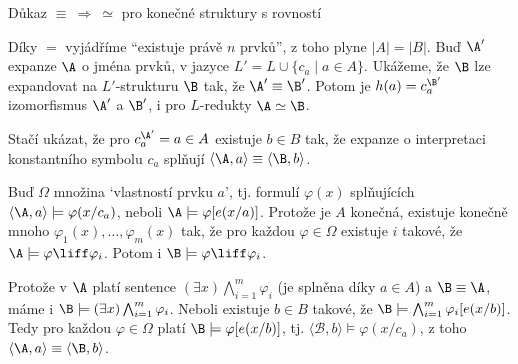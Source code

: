 \documentclass{beamer}
\begin{document}
\begin{frame}{Důkaz $\equiv\ \Rightarrow\ \simeq$ pro konečné struktury s rovností}
    
    \vspace{-6pt}
    Díky $=$ vyjádříme ``existuje právě $n$ prvků'', z toho plyne \alert{$|A|=|B|$}.    
    Buď $\A'$ expanze $\A$ o jména prvků, v jazyce $L'=L\cup\{c_a\mid a\in A\}$. Ukážeme, že $\B$ \alert{lze expandovat} na $L'$-strukturu $\B$ \alert{tak, že $\A'\equiv \B'$}.     
    Potom je \alert{$h(a)= c_a^{\B'}$} izomorfismus $\A'$ a $\B'$, i pro $L$-redukty $\A\simeq\B$.
    
    Stačí ukázat, že \alert{pro $c_a^{\A'}=a\in A$ existuje $b\in B$} tak, že expanze o interpretaci konstantního symbolu $c_a$ splňují \alert{$\langle \A,a\rangle\equiv\langle\B,b\rangle$}. 
    
    Buď $\Omega$ množina `\alert{vlastností prvku $a$}', tj. formulí $\varphi(x)$ splňujících $\langle \A,a\rangle \models \varphi(x/c_a)$, neboli $\A\models \varphi[e(x/a)]$. Protože je $A$ konečná, existuje \alert{konečně mnoho $\varphi_1(x),\dots,\varphi_m(x)$} tak, že pro každou $\varphi \in \Omega$ existuje $i$ takové, že $\A\models \varphi\liff\varphi_i$. Potom i $\B\models\varphi\liff\varphi_i$. %
        
        Protože v $\A$ platí sentence \alert{$(\exists x)\bigwedge_{i=1}^m\varphi_i$} (je splněna díky $a\in A$) a $\B\equiv\A$, máme i $\B\models (\exists x)\bigwedge_{i=1}^m\varphi_i$. Neboli existuje $b\in B$ takové, že $\B\models \bigwedge_{i=1}^m\varphi_i[e(x/b)]$. Tedy pro každou $\varphi\in \Omega$ platí $\B\models \varphi[e(x/b)]$, tj. $\langle\mathcal{B},b\rangle\models \varphi(x/c_a)$, z toho $\langle \A,a\rangle\equiv\langle\B,b\rangle$.\hfill\qedsymbol

\end{frame}
\end{document}
